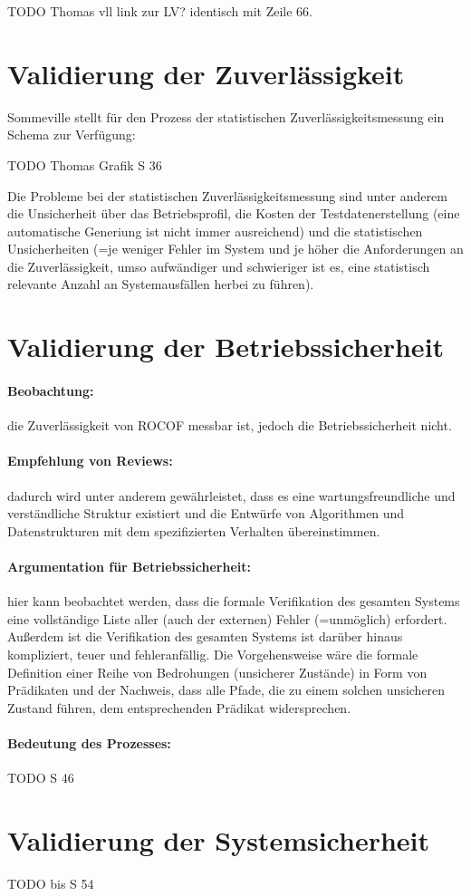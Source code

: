 TODO Thomas vll link zur LV? identisch mit Zeile 66.

\section{Validierung der Zuverlässigkeit}
Sommeville stellt für den Prozess der statistischen Zuverlässigkeitsmessung ein Schema zur Verfügung:

TODO Thomas Grafik S 36

Die Probleme bei der statistischen Zuverlässigkeitsmessung sind unter anderem die Unsicherheit über das Betriebsprofil, die Kosten der Testdatenerstellung (eine automatische Generiung ist nicht immer ausreichend) und die statistischen Unsicherheiten (=je weniger Fehler im System und je höher die Anforderungen an die Zuverlässigkeit, umso aufwändiger und schwieriger ist es, eine statistisch relevante Anzahl an Systemausfällen herbei zu führen).

\section{Validierung der Betriebssicherheit}
\paragraph{Beobachtung:} die Zuverlässigkeit von ROCOF messbar ist, jedoch die Betriebssicherheit nicht. 

\paragraph{Empfehlung von Reviews:} dadurch wird unter anderem gewährleistet, dass es eine wartungsfreundliche und verständliche Struktur existiert und die Entwürfe von Algorithmen und Datenstrukturen mit dem spezifizierten Verhalten übereinstimmen.  

\paragraph{Argumentation für Betriebssicherheit: } hier kann beobachtet werden, dass die formale Verifikation des gesamten Systems eine vollständige Liste aller (auch der externen) Fehler (=unmöglich) erfordert. Außerdem ist die Verifikation des gesamten Systems ist darüber hinaus kompliziert, teuer und fehleranfällig. Die Vorgehensweise wäre die formale Definition einer Reihe von Bedrohungen (unsicherer Zustände) in Form von Prädikaten und der Nachweis, dass alle Pfade, die zu einem solchen unsicheren Zustand führen, dem entsprechenden Prädikat widersprechen. 

\paragraph{Bedeutung des Prozesses: } 
TODO S 46

\section{Validierung der Systemsicherheit}

TODO bis S 54